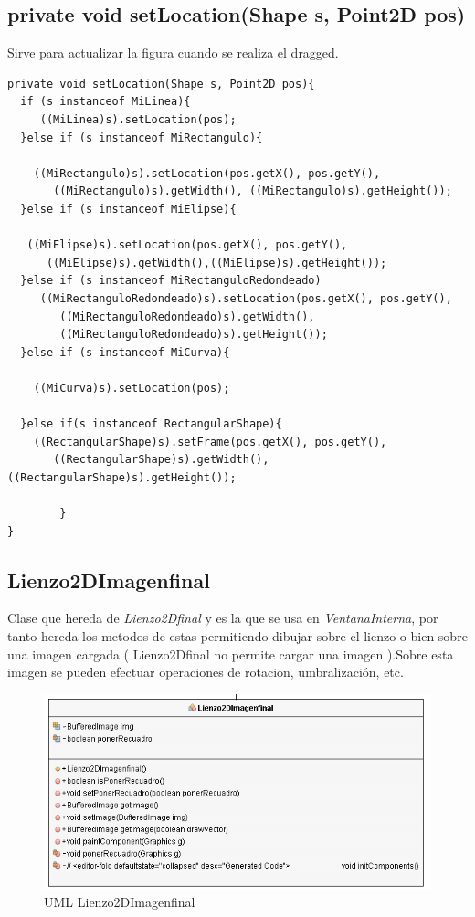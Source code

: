 \subsection*{private void setLocation(Shape s, Point2D pos)}
Sirve para actualizar la figura cuando se realiza el dragged.
\begin{lstlisting}
private void setLocation(Shape s, Point2D pos){
  if (s instanceof MiLinea){
     ((MiLinea)s).setLocation(pos);
  }else if (s instanceof MiRectangulo){
           
    ((MiRectangulo)s).setLocation(pos.getX(), pos.getY(), 
       ((MiRectangulo)s).getWidth(), ((MiRectangulo)s).getHeight());
  }else if (s instanceof MiElipse){
           
   ((MiElipse)s).setLocation(pos.getX(), pos.getY(), 
      ((MiElipse)s).getWidth(),((MiElipse)s).getHeight());
  }else if (s instanceof MiRectanguloRedondeado)
     ((MiRectanguloRedondeado)s).setLocation(pos.getX(), pos.getY(), 
        ((MiRectanguloRedondeado)s).getWidth(),
        ((MiRectanguloRedondeado)s).getHeight()); 
  }else if (s instanceof MiCurva){
            
    ((MiCurva)s).setLocation(pos);
          
  }else if(s instanceof RectangularShape){
    ((RectangularShape)s).setFrame(pos.getX(), pos.getY(), 
       ((RectangularShape)s).getWidth(),((RectangularShape)s).getHeight());
       
        }
}
\end{lstlisting}

\subsection{Lienzo2DImagenfinal}
Clase que hereda de \emph{Lienzo2Dfinal} y es la que se usa en \emph{VentanaInterna}, por tanto hereda los metodos de estas permitiendo dibujar sobre el lienzo o bien sobre una imagen cargada ( Lienzo2Dfinal no permite cargar una imagen ).Sobre esta imagen se pueden efectuar operaciones de rotacion, umbralización, etc.

\begin{figure}[H]
  \centering
    \includegraphics[scale=0.75]{images/lienzo2dimagenfinal}
  \caption{UML Lienzo2DImagenfinal}
  \label{UML Lienzo2DImagenfinal}
\end{figure}

